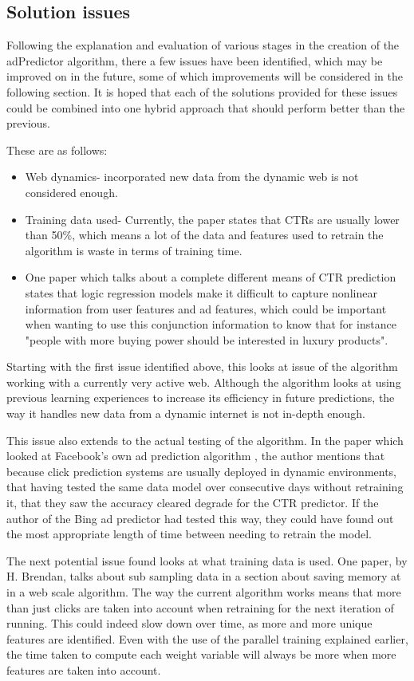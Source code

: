 \documentclass[journal]{IEEEtran}
\begin{document}
\subsection{Solution issues}
Following the explanation and evaluation of various stages in the creation of the adPredictor algorithm, there a few issues have been identified, which may be improved on in the future, some of which improvements will be considered in the following section. It is hoped that each of the solutions provided for these issues could be combined into one hybrid approach that should perform better than the previous. \par
These are as follows:
\begin{itemize}
\item Web dynamics- incorporated new data from the dynamic web is not considered enough.
\item Training data used- Currently, the paper states that CTRs are usually lower than 50\%, which means a lot of the data and features used to retrain the algorithm is waste in terms of training time.
\item One paper \cite{lasso} which talks about a complete different means of CTR prediction states that logic regression models make it difficult to capture nonlinear information from user features and ad features, which could be important when wanting to use this conjunction information to know that for instance "people with more buying power should be interested in luxury products".
\end{itemize}
Starting with the first issue identified above, this looks at issue of the algorithm working with a currently very active web. Although the algorithm looks at using previous learning experiences to increase its efficiency in future predictions, the way it handles new data from a dynamic internet is not in-depth enough. \par
This issue also extends to the actual testing of the algorithm. In the paper which looked at Facebook's own ad prediction algorithm \cite{facebook}, the author mentions that because click prediction systems are usually deployed in dynamic environments, that having tested the same data model over consecutive days without retraining it, that they saw the accuracy cleared degrade for the CTR predictor. If the author of the Bing ad predictor had tested this way, they could have found out the most appropriate length of time between needing to retrain the model. \par
The next potential issue found looks at what training data is used. One paper, by H. Brendan, talks about sub sampling data in a section about saving memory at in a web scale algorithm. The way the current algorithm works means that more than just clicks are taken into account when retraining for the next iteration of running. This could indeed slow down over time, as more and more unique features are identified. Even with the use of the parallel training explained earlier, the time taken to compute each weight variable will always be more when more features are taken into account. \par
\end{document}
